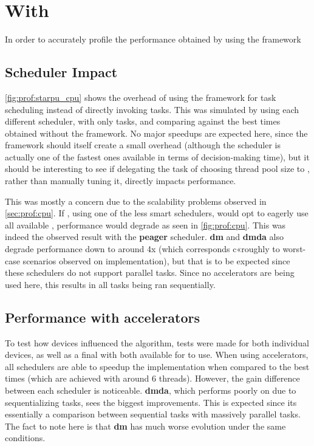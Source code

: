 \documentclass[main.tex]{subfiles}
\begin{document}
\section{With \starpu}

In order to accurately profile the performance obtained by using the framework

\subsection{Scheduler Impact}

\cref{fig:prof:starpu_cpu} shows the overhead of using the framework for task scheduling instead of directly invoking tasks. This was simulated by using each different scheduler, with only \cpu tasks, and comparing against the best \cpu times obtained without the framework. No major speedups are expected here, since the framework should itself create a small overhead (although the scheduler is actually one of the fastest ones available in terms of decision-making time), but it should be interesting to see if delegating the task of choosing \openmp thread pool size to \starpu, rather than manually tuning it, directly impacts performance.

This was mostly a concern due to the scalability problems observed in \cref{sec:prof:cpu}. If \starpu, using one of the less smart schedulers, would opt to eagerly use all available \cpus, performance would degrade as seen in \cref{fig:prof:cpu}. This was indeed the observed result with the \textbf{peager} scheduler. \textbf{dm} and \textbf{dmda} also degrade performance down to around 4x (which corresponds c«roughly to worst-case scenarios observed on \cpu implementation), but that is to be expected since these schedulers do not support parallel tasks. Since no accelerators are being used here, this results in all tasks being ran sequentially.


\subsection{Performance with accelerators}

To test how \cuda devices influenced the algorithm, tests were made for both individual \cuda devices, as well as a final with both \gpus available for \starpu to use.
When using accelerators, all schedulers are able to speedup the implementation when compared to the best \cpu times (which are achieved with around 6 threads). However, the gain difference between each scheduler is noticeable. \textbf{dmda}, which performs poorly on \cpu due to sequentializing tasks, sees the biggest improvements. This is expected since its essentially a comparison between sequential \cpu tasks with massively parallel \cuda tasks. The fact to note here is that \textbf{dm} has much worse evolution under the same conditions.
\end{document}
